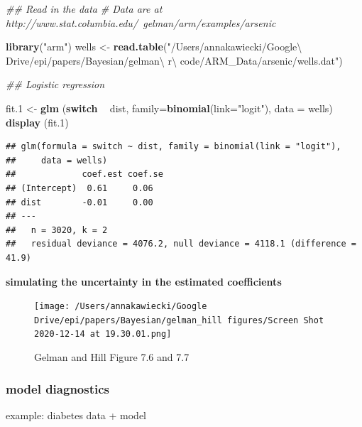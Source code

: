 \documentclass[
]{article}
\newenvironment{Shaded}{\begin{snugshade}}{\end{snugshade}}
\newcommand{\CommentTok}[1]{\textcolor[rgb]{0.56,0.35,0.01}{\textit{#1}}}
\newcommand{\ControlFlowTok}[1]{\textcolor[rgb]{0.13,0.29,0.53}{\textbf{#1}}}
\newcommand{\DataTypeTok}[1]{\textcolor[rgb]{0.13,0.29,0.53}{#1}}
\newcommand{\FloatTok}[1]{\textcolor[rgb]{0.00,0.00,0.81}{#1}}
\newcommand{\KeywordTok}[1]{\textcolor[rgb]{0.13,0.29,0.53}{\textbf{#1}}}
\newcommand{\NormalTok}[1]{#1}
\newcommand{\OperatorTok}[1]{\textcolor[rgb]{0.81,0.36,0.00}{\textbf{#1}}}
\newcommand{\StringTok}[1]{\textcolor[rgb]{0.31,0.60,0.02}{#1}}
\begin{document}
\begin{Shaded}
\begin{Highlighting}[]
\CommentTok{## Read in the data}
\CommentTok{# Data are at http://www.stat.columbia.edu/~gelman/arm/examples/arsenic}

\KeywordTok{library}\NormalTok{(}\StringTok{"arm"}\NormalTok{)}
\NormalTok{wells <-}\StringTok{ }\KeywordTok{read.table}\NormalTok{(}\StringTok{"/Users/annakawiecki/Google\textbackslash{} Drive/epi/papers/Bayesian/gelman\textbackslash{} r\textbackslash{} code/ARM_Data/arsenic/wells.dat"}\NormalTok{)}

\CommentTok{## Logistic regression }

\NormalTok{fit}\FloatTok{.1}\NormalTok{ <-}\StringTok{ }\KeywordTok{glm}\NormalTok{ (}\ControlFlowTok{switch} \OperatorTok{~}\StringTok{ }\NormalTok{dist, }\DataTypeTok{family=}\KeywordTok{binomial}\NormalTok{(}\DataTypeTok{link=}\StringTok{"logit"}\NormalTok{), }\DataTypeTok{data =}\NormalTok{ wells)}
\KeywordTok{display}\NormalTok{ (fit}\FloatTok{.1}\NormalTok{)}
\end{Highlighting}
\end{Shaded}

\begin{verbatim}
## glm(formula = switch ~ dist, family = binomial(link = "logit"), 
##     data = wells)
##             coef.est coef.se
## (Intercept)  0.61     0.06  
## dist        -0.01     0.00  
## ---
##   n = 3020, k = 2
##   residual deviance = 4076.2, null deviance = 4118.1 (difference = 41.9)
\end{verbatim}

\textbf{simulating the uncertainty in the estimated coefficients}

\begin{figure}
\centering
\texttt{[image: /Users/annakawiecki/Google Drive/epi/papers/Bayesian/gelman\_hill figures/Screen Shot 2020-12-14 at 19.30.01.png]}
\caption{Gelman and Hill Figure 7.6 and 7.7}
\end{figure}

\hypertarget{model-diagnostics}{%
\subsubsection{model diagnostics}\label{model-diagnostics}}

example: diabetes data + model
\end{document}
